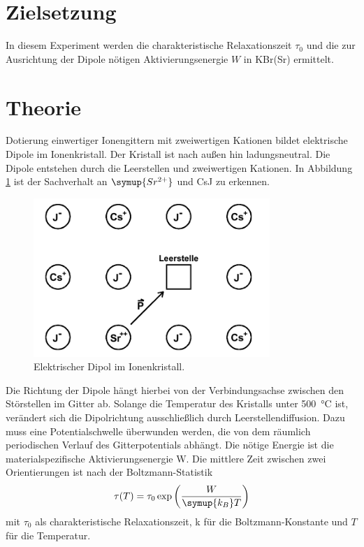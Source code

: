 \section{Zielsetzung}
\label{sec:Zielsetzung}
In diesem Experiment werden die charakteristische Relaxationszeit $\tau_0$ und die zur Ausrichtung der Dipole nötigen Aktivierungsenergie $W$ in KBr(Sr) ermittelt. 
\section{Theorie}
\label{sec:Theorie}
Dotierung einwertiger Ionengittern mit zweiwertigen Kationen bildet elektrische Dipole im Ionenkristall.
Der Kristall ist nach außen hin ladungsneutral.
Die Dipole entstehen durch die Leerstellen und zweiwertigen Kationen.
In Abbildung \ref{fig:Dipol} ist der Sachverhalt an $\symup{Sr^{2+}}$ und CsJ zu erkennen.
\begin{figure}[htb]
  \centering
  \includegraphics[height=6cm]{pics/Dipole.png}
  \caption{Elektrischer Dipol im Ionenkristall. \cite{anleitung}}
  \label{fig:Dipol}
\end{figure}
\FloatBarrier

Die Richtung der Dipole hängt hierbei von der Verbindungsachse zwischen den Störstellen im Gitter ab.
Solange die Temperatur des Kristalls unter \SI{500}{\celsius} ist, verändert sich die Dipolrichtung ausschließlich durch Leerstellendiffusion.
Dazu muss eine Potentialschwelle überwunden werden, die von dem räumlich periodischen Verlauf des Gitterpotentials abhängt.
Die nötige Energie ist die materialspezifische Aktivierungsenergie W.
Die mittlere Zeit zwischen zwei Orientierungen ist nach der Boltzmann-Statistik
\begin{equation}
    \label{eqn:Relaxzeit}
    \tau(T) = \tau_0 \exp\left(\frac{W}{\symup{k_B} T}\right)
\end{equation}
mit $\tau_0$ als charakteristische Relaxationszeit, k für die Boltzmann-Konstante und $T$ für die Temperatur.

